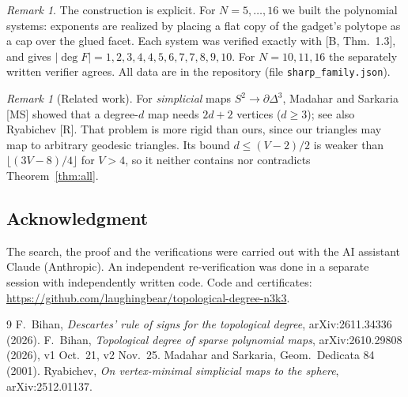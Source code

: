 \documentclass[11pt]{amsart}
\theoremstyle{remark}
\newtheorem{remark}[theorem]{Remark}
\begin{document}
\begin{remark}
The construction is explicit. For $N=5,\dots,16$ we built the polynomial systems: exponents are realized by placing a flat copy of the gadget's polytope as a cap over the glued facet. Each system was verified exactly with [B, Thm.~1.3], and gives $|\deg F|=1,2,3,4,4,5,6,7,7,8,9,10$. For $N=10,11,16$ the separately written verifier agrees.
All data are in the repository (file \texttt{sharp\_family.json}).
\end{remark}

\begin{remark}[Related work]
For \emph{simplicial} maps $S^2\to\partial\Delta^3$, Madahar and Sarkaria [MS] showed that a degree-$d$ map needs $2d+2$ vertices ($d\ge3$); see also Ryabichev [R]. That problem is more rigid than ours, since our triangles may map to arbitrary geodesic triangles. Its bound $d\le(V-2)/2$ is weaker than $\lfloor(3V-8)/4\rfloor$ for $V>4$, so it neither contains nor contradicts Theorem~\ref{thm:all}.
\end{remark}

\subsection*{Acknowledgment}
The search, the proof and the verifications were carried out with the AI assistant Claude (Anthropic). An independent re-verification was done in a separate session with independently written code.
Code and certificates: \url{https://github.com/laughingbear/topological-degree-n3k3}.

\begin{thebibliography}{9}
 F.~Bihan, \emph{Descartes' rule of signs for the topological degree}, arXiv:2611.34336 (2026).
 F.~Bihan, \emph{Topological degree of sparse polynomial maps}, arXiv:2610.29808 (2026), v1 Oct.~21, v2 Nov.~25.
 Madahar and Sarkaria, Geom.\ Dedicata 84 (2001).
 Ryabichev, \emph{On vertex-minimal simplicial maps to the sphere}, arXiv:2512.01137.
\end{thebibliography}
\end{document}
